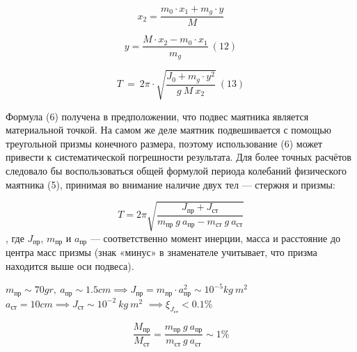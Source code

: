 \documentclass[a4paper,12pt]{article} %
\begin{document}
\[x_{2} = \frac{m_0 \cdot x_{1} + m_g \cdot y}{M}\]

\[y = \frac{M \cdot x_{2} - m_0 \cdot x_{1}}{m_g} \ (12)\]

\[T\ =\ 2\pi \cdot \sqrt{\frac{J_0 + m_g \cdot y^2}{g\ M\ x_2}} \ (13)\]


Формула (6) получена в предположении, что подвес маятника является материальной точкой. На самом же деле маятник подвешивается с помощью треугольной призмы конечного размера, поэтому использование (6) может привести к систематической погрешности результата. Для более точных расчётов следовало бы воспользоваться общей формулой периода колебаний физического маятника (5), принимая во внимание наличие двух тел — стержня и призмы:

\[T = 2\pi \sqrt{\frac{J_{\text{пр}} + J_{\text{ст}}}{m_{\text{пр}}\ g\ a_{\text{пр}} - m_{\text{ст}}\ g\ a_{\text{ст}}}}\],
где $J_{\text{пр}}$, $m_{\text{пр}}$ и $a_{\text{пр}}$ — соответственно момент инерции, масса и расстояние
до центра масс призмы (знак «минус» в знаменателе учитывает, что призма находится выше оси подвеса).

$m_{\text{пр}} \sim 70gr,\ a_{\text{пр}} \sim 1.5cm \implies J_{\text{пр}} = m_{\text{пр}}\cdot a_{\text{пр}}^2 \sim 10^{-5} kg\ m^2$ $a_{\text{ст}} = 10cm \implies J_{\text{ст}} \sim 10^{-2}\ kg\ m^2$
$\implies \xi_{J_{\text{ст}}} < 0.1\%$

\[\frac{M_{\text{пр}}}{M_{\text{ст}}} = \frac{m_{\text{пр}}\ g\ a_{\text{пр}}}{m_{\text{ст}}\ g\ a_{\text{ст}}} \sim 1\%\]
\end{document}
